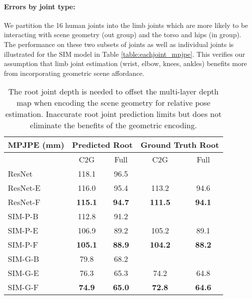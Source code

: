 \documentclass[times,referee,twocolumn,final,authoryear]{elsarticle}
\begin{document}
\paragraph{Errors by joint type:} We partition the 16 human joints into the limb
joints which are more likely to be interacting with scene geometry (out group)
and the torso and hips (in group).  The performance on these two subsets of
joints as well as individual joints is illustrated for the SIM model in 
Table \ref{table:eachjoint_mpjpe}. This verifies our assumption that limb 
joint estimation (wrist, elbow, knees, ankles) benefits more from incorporating 
geometric scene affordance. 

\begin{table}[t]
\begin{center}
\small
\begin{tabular}{l|c|c|c|c}
\hline
 MPJPE (mm) &  \multicolumn{2}{c}{Predicted Root} & \multicolumn{2}{c}{Ground Truth Root} \\
\hline
  & C2G & Full &   C2G & Full\\
\hline
\hline
 ResNet & 118.1 & 96.5 &    &   \\
 \hline
 ResNet-E & 116.0 & 95.4 &   113.2  & 94.6\\
 \hline
 ResNet-F & \textbf{115.1} & \textbf{94.7} & \textbf{111.5} & \textbf{94.1}\\
\hline
\hline
 SIM-P-B & 112.8 & 91.2 &   &  \\
 \hline
 SIM-P-E & 106.9 & 89.2 &  105.2  &  89.1\\
 \hline
 SIM-P-F & \textbf{105.1} & \textbf{88.9} &  \textbf{104.2}  &  \textbf{88.2}\\
\hline
\hline
 SIM-G-B & 79.8 & 68.2 & & \\
 \hline
 SIM-G-E & 76.3 & 65.3   & 74.2  &  64.8\\
 \hline
 SIM-G-F & \textbf{74.9} & \textbf{65.0} & \textbf{72.8}  &  \textbf{64.6}\\
\hline
\end{tabular}
\end{center}
\caption{The root joint depth is needed to offset the multi-layer depth map when encoding the scene geometry for relative pose estimation. Inaccurate root joint prediction limits but does not eliminate
the benefits of the geometric encoding.}
\label{table:mpjpe-j}
\end{table}
\end{document}
